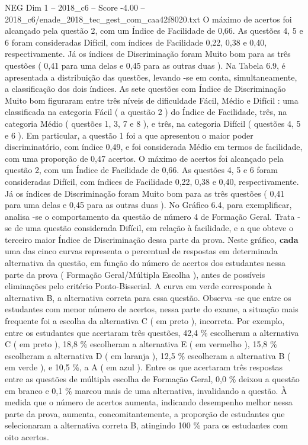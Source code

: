 \begin{textsample}{NEG Dim 1 – 2018\_c6 – Score -4.00 – 2018\_c6/enade\_2018\_tec\_gest\_com\_caa42f8020.txt}
O máximo de acertos foi alcançado pela questão 2, com um Índice de Facilidade de 0,66.
As questões 4, 5 e 6 foram consideradas Difícil, com índices de Facilidade 0,22, 0,38 e 0,40, respectivamente.
Já os índices de Discriminação foram Muito bom para as três questões ( 0,41 para uma delas e 0,45 para as outras duas ).
Na Tabela 6.9, é apresentada a distribuição das questões, levando -se em conta, simultaneamente, a classificação dos dois índices.
As sete questões com Índice de Discriminação Muito bom figuraram entre três níveis de dificuldade Fácil, Médio e Difícil : uma classificada na categoria Fácil ( a questão 2 ) do Índice de Facilidade, três, na categoria Médio ( questões 1, 3, 7 e 8 ), e três, na categoria Difícil ( questões 4, 5 e 6 ).
Em particular, a questão 1 foi a que apresentou o maior poder discriminatório, com índice 0,49, e foi considerada Médio em termos de facilidade, com uma proporção de 0,47 acertos.
O máximo de acertos foi alcançado pela questão 2, com um Índice de Facilidade de 0,66.
As questões 4, 5 e 6 foram consideradas Difícil, com índices de Facilidade 0,22, 0,38 e 0,40, respectivamente.
Já os índices de Discriminação foram Muito bom para as três questões ( 0,41 para uma delas e 0,45 para as outras duas ).
No Gráfico 6.4, para exemplificar, analisa -se o comportamento da questão de número 4 de Formação Geral.
Trata -se de uma questão considerada Difícil, em relação à facilidade, e a que obteve o terceiro maior Índice de Discriminação dessa parte da prova.
Neste gráfico, \textbf{cada} uma das cinco curvas representa o percentual de respostas em determinada alternativa da questão, em função do número de acertos dos estudantes nessa parte da prova ( Formação Geral/Múltipla Escolha ), antes de possíveis eliminações pelo critério Ponto-Bisserial.
A curva em verde corresponde à alternativa B, a alternativa correta para essa questão.
Observa -se que entre os estudantes com menor número de acertos, nessa parte do exame, a situação mais frequente foi a escolha da alternativa C ( em preto ), incorreta.
Por exemplo, entre os estudantes que acertaram três questões, 42,4 \% escolheram a alternativa C ( em preto ), 18,8 \% escolheram a alternativa E ( em vermelho ), 15,8 \% escolheram a alternativa D ( em laranja ), 12,5 \% escolheram a alternativa B ( em verde ), e 10,5 \%, a A ( em azul ).
Entre os que acertaram três respostas entre as questões de múltipla escolha de Formação Geral, 0,0 \% deixou a questão em branco e 0,1 \% marcou mais de uma alternativa, invalidando a questão.
À medida que o número de acertos aumenta, indicando desempenho melhor nessa parte da prova, aumenta, concomitantemente, a proporção de estudantes que selecionaram a alternativa correta B, atingindo 100 \% para os estudantes com oito acertos.

\end{textsample}
